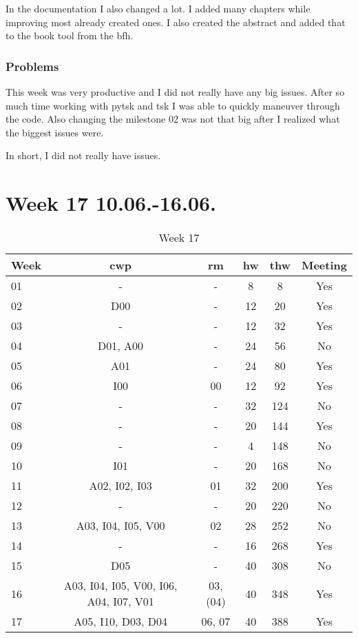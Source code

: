 In the documentation I also changed a lot. I added many chapters while improving most already created ones. I also created the abstract and added that to the book tool from the \gls{bfh}.

\subsubsection{Problems}

This week was very productive and I did not really have any big issues. After so much time working with \gls{pytsk} and \gls{tsk} I was able to quickly maneuver through the code. Also changing the milestone 02 was not that big after I realized what the biggest issues were. 

In short, I did not really have issues.

\section{Week 17 10.06.-16.06.}
\label{sec:journal:week17}

\begin{table}[!ht]
    \begin{center}
        \caption{Week 17}
        \label{tab:journal:week17}
        \begin{tabular}{l|c|c|c|c|c}
            \textbf{Week} & \textbf{\gls{cwp}} & \textbf{\gls{rm}} & \textbf{\gls{hw}} & \textbf{\gls{thw}} & \textbf{Meeting}\\
        \hline
        01 & - & - & 8 & 8 & Yes \\
        02 & D00 & - & 12 & 20 & Yes \\
        03 & - & - & 12 & 32 & Yes \\
        04 & D01, A00 & - & 24 & 56 & No \\
        05 & A01 & - & 24 & 80 & Yes \\
        06 & I00 & 00 & 12 & 92 & Yes \\
        07 & - & - & 32 & 124 & No \\
        08 & - & - & 20 & 144 & Yes \\
        09 & - & - & 4 & 148 & No \\
        10 & I01 & - & 20 & 168 & No \\
        11 & A02, I02, I03 & 01 & 32 & 200 & Yes \\
        12 & - & - & 20 & 220 & No \\
        13 & A03, I04, I05, V00 & 02 & 28 & 252 & No \\
        14 & - & - & 16 & 268 & Yes \\
        15 & D05 & - & 40 & 308 & No \\
        16 & A03, I04, I05, V00, I06, A04, I07, V01 & 03, (04) & 40 & 348 & Yes \\
        17 & A05, I10, D03, D04 & 06, 07 & 40 & 388 & Yes \\
        \end{tabular}
    \end{center}
\end{table}

